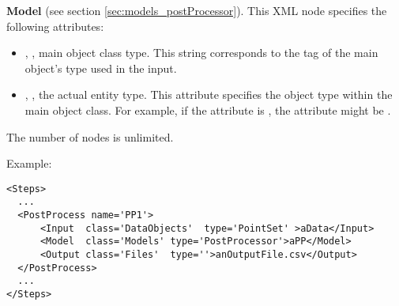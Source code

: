 \begin{itemize}
  \textbf{Model} (see section \ref{sec:models_postProcessor}).
  This XML node specifies the following attributes:
\begin{itemize}
  \item {}, , main object class
    type.
    This string corresponds to the tag of the main object's type used in the
    input.
  \item {}, , the actual entity
    type.
    This attribute specifies the object type within the main object class.
    For example, if the   attribute is , the
     attribute might be .
\end{itemize}
\nb The number of  nodes is unlimited.
\end{itemize}

Example:
\begin{lstlisting}[style=XML,morekeywords={class}]
<Steps>
  ...
  <PostProcess name='PP1'>
      <Input  class='DataObjects'  type='PointSet' >aData</Input>
      <Model  class='Models' type='PostProcessor'>aPP</Model>
      <Output class='Files'  type=''>anOutputFile.csv</Output>
  </PostProcess>
  ...
</Steps>
\end{lstlisting}
